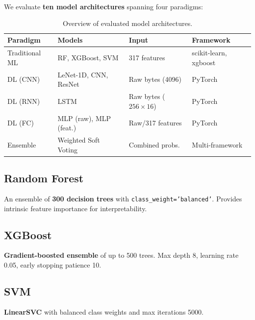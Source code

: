 \documentclass[12pt,a4paper]{report}
\begin{document}
\chapter{}
\begin{normalsize}
\noindent

{\setlength{\baselineskip}{1.0\baselineskip}
We evaluate \textbf{ten model architectures} spanning four paradigms:

\begin{table}[H]
\centering
\caption{Overview of evaluated model architectures.}
\label{tab:model_overview}
\small
\begin{tabular}{llll}
\toprule
\textbf{Paradigm} & \textbf{Models} & \textbf{Input} & \textbf{Framework} \\
\midrule
Traditional ML & RF, XGBoost, SVM & 317 features & scikit-learn, xgboost \\
DL (CNN) & LeNet-1D, CNN, ResNet & Raw bytes (4096) & PyTorch \\
DL (RNN) & LSTM & Raw bytes ($256 \times 16$) & PyTorch \\
DL (FC) & MLP (raw), MLP (feat.) & Raw/317 features & PyTorch \\
Ensemble & Weighted Soft Voting & Combined probs. & Multi-framework \\
\bottomrule
\end{tabular}
\end{table}
\par}

\section{Random Forest}
{\setlength{\baselineskip}{0.95\baselineskip}
An ensemble of \textbf{300 decision trees} with \texttt{class\_weight='balanced'}. Provides intrinsic feature importance for interpretability.
\par}

\section{XGBoost}
{\setlength{\baselineskip}{0.95\baselineskip}
\textbf{Gradient-boosted ensemble} of up to 500 trees. Max depth 8, learning rate 0.05, early stopping patience 10.
\par}

\section{SVM}
{\setlength{\baselineskip}{0.95\baselineskip}
\textbf{LinearSVC} with balanced class weights and max iterations 5000.
\par}


\end{normalsize}
\end{document}
